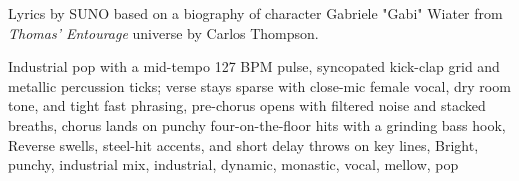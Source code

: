 
\begin{notes}
Lyrics by SUNO based on a biography of character Gabriele "Gabi" Wiater from \emph{Thomas’ Entourage} universe by Carlos Thompson.
\end{notes}
\begin{style}
Industrial pop with a mid-tempo 127 BPM pulse, syncopated kick-clap grid and metallic percussion ticks; verse stays sparse with close-mic female vocal, dry room tone, and tight fast phrasing, pre-chorus opens with filtered noise and stacked breaths, chorus lands on punchy four-on-the-floor hits with a grinding bass hook, Reverse swells, steel-hit accents, and short delay throws on key lines, Bright, punchy, industrial mix, industrial, dynamic, monastic, vocal, mellow, pop
\end{style}
